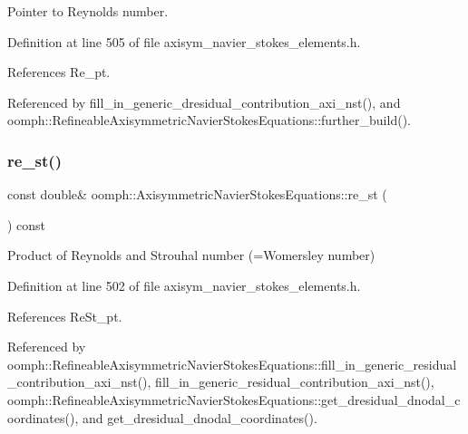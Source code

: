 Pointer to Reynolds number. 



Definition at line 505 of file axisym\+\_\+navier\+\_\+stokes\+\_\+elements.\+h.



References Re\+\_\+pt.



Referenced by fill\+\_\+in\+\_\+generic\+\_\+dresidual\+\_\+contribution\+\_\+axi\+\_\+nst(), and oomph\+::\+Refineable\+Axisymmetric\+Navier\+Stokes\+Equations\+::further\+\_\+build().

\mbox{\label{classoomph_1_1AxisymmetricNavierStokesEquations_aa951cf371f58231f3c0967255843a50a}} 
\subsubsection{\texorpdfstring{re\+\_\+st()}{re\_st()}}
{\footnotesize\ttfamily const double\& oomph\+::\+Axisymmetric\+Navier\+Stokes\+Equations\+::re\+\_\+st (\begin{DoxyParamCaption}{ }\end{DoxyParamCaption}) const\hspace{0.3cm}{\ttfamily [inline]}}



Product of Reynolds and Strouhal number (=Womersley number) 



Definition at line 502 of file axisym\+\_\+navier\+\_\+stokes\+\_\+elements.\+h.



References Re\+St\+\_\+pt.



Referenced by oomph\+::\+Refineable\+Axisymmetric\+Navier\+Stokes\+Equations\+::fill\+\_\+in\+\_\+generic\+\_\+residual\+\_\+contribution\+\_\+axi\+\_\+nst(), fill\+\_\+in\+\_\+generic\+\_\+residual\+\_\+contribution\+\_\+axi\+\_\+nst(), oomph\+::\+Refineable\+Axisymmetric\+Navier\+Stokes\+Equations\+::get\+\_\+dresidual\+\_\+dnodal\+\_\+coordinates(), and get\+\_\+dresidual\+\_\+dnodal\+\_\+coordinates().

\mbox{\label{classoomph_1_1AxisymmetricNavierStokesEquations_a64f354d90dcae78352e08b369a4c2a02}} 
